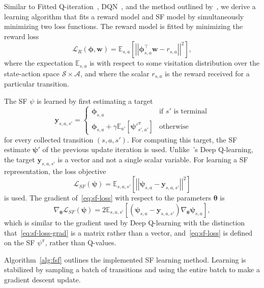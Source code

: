 \documentclass{article}
\newcommand{\norm}[1]{\left|\left|#1\right|\right|}
\begin{document}
Similar to Fitted Q-iteration~\cite{antos2006fittedQ}, DQN~\cite{mnih2015human}, and the method outlined by~\citet{zhang2016deep}, we derive a learning algorithm that fits a reward model and SF model by simultaneously minimizing two loss functions.
The reward model is fitted by minimizing the reward loss
\begin{equation}
\mathcal{L}_R(\pmb{\phi},\pmb{w}) = \mathbb{E}_{s,a} \left[ \norm{\pmb{\phi}_{s,a}^\top \pmb{w} - r_{s,a}}^2 \right], \label{eq:reward-loss}
\end{equation}
where the expectation $\mathbb{E}_{s,a}$ is with respect to some visitation distribution over the state-action space $\mathcal{S} \times \mathcal{A}$, and where the scalar $r_{s,a}$ is the reward received for a particular transition.

The SF $\psi$ is learned by first estimating a target 
\begin{equation}
\pmb{y}_{s,a,s'} = \begin{cases} \pmb{\phi}_{s,a} &\text{if $s'$ is terminal} \\ \pmb{\phi}_{s,a} + \gamma \mathbb{E}_{a'} \left[ \pmb{\psi'}_{s',a'}^\pi \right] &\text{otherwise} \end{cases}
\end{equation}
for every collected transition $(s,a,s')$.
For computing this target, the SF estimate $\pmb{\psi'}$ of the previous update iteration is used.
Unlike~\citeauthor{mnih2015human}'s Deep Q-learning, the target $\pmb{y}_{s,a,s'}$ is a vector and not a single scalar variable.
For learning a SF representation, the loss objective
\begin{equation}
\mathcal{L}_{SF}(\pmb{\psi}) = \mathbb{E}_{s,a,s'} \left[ \norm{ \pmb{\psi}_{s,a} - \pmb{y}_{s,a,s'} }^2 \right] \label{eq:sf-loss}
\end{equation}
is used.
The gradient of~\eqref{eq:sf-loss} with respect to the parameters $\pmb{\theta}$ is %
\begin{equation}
\nabla_{\pmb{\theta}} \mathcal{L}_{SF}(\pmb{\psi}) = 2 \mathbb{E}_{s,a,s'} \left[ ( \pmb{\psi}_{s,a} - \pmb{y}_{s,a,s'} ) \nabla_{\pmb{\theta}} \pmb{\psi}_{s,a} \right], \label{eq:sf-loss-grad}
\end{equation}
which is similar to the gradient used by Deep Q-learning with the distinction that~\eqref{eq:sf-loss-grad} is a matrix rather than a vector, and~\eqref{eq:sf-loss} is defined on the SF $\psi^\pi$, rather than Q-values.

Algorithm~\ref{alg:fsf} outlines the implemented SF learning method.
Learning is stabilized by sampling a batch of transitions and using the entire batch to make a gradient descent update.
\end{document}
